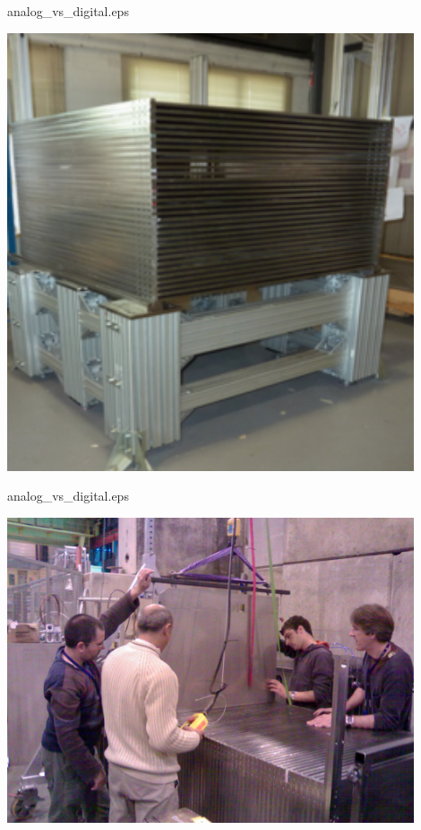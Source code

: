 \begin{frame}{analog\_vs\_digital.eps}
  \centerline{\includegraphics[width=0.9\textwidth]{images/ConstructionStructure}}
\end{frame}
\begin{frame}{analog\_vs\_digital.eps}
  \centerline{\includegraphics[width=0.9\textwidth]{images/ConstructionInsertion}}
\end{frame}


